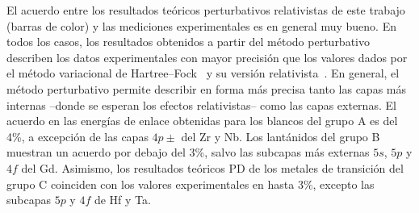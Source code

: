 El acuerdo entre los resultados teóricos perturbativos relativistas de 
este trabajo (barras de color) y las mediciones experimentales es en 
general muy bueno. En todos los casos, los resultados obtenidos a partir 
del método perturbativo describen los datos experimentales con mayor 
precisión que los valores dados por el método variacional de 
Hartree--Fock~\cite{FroeseFischer:97} y su versión 
relativista~\cite{Desclaux:73}. En general, el método perturbativo 
permite describir en forma más precisa tanto las capas más internas 
--donde se esperan los efectos relativistas-- como las capas externas.
El acuerdo en las energías de enlace obtenidas para los blancos del 
grupo A es del 
4\%, a excepción de las capas $4p\pm$ del Zr y Nb. Los lantánidos del 
grupo B muestran un acuerdo por debajo del 3\%, salvo las subcapas más 
externas $5s$, $5p$ y $4f$ del Gd. Asimismo, los resultados teóricos PD 
de los metales de transición del grupo C coinciden con los valores 
experimentales en hasta 3\%, excepto las subcapas $5p$ y $4f$ de Hf y 
Ta. 



